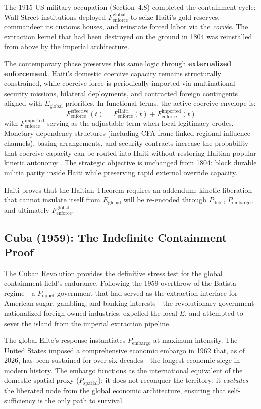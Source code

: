 \documentclass[12pt,openany]{book}
\begin{document}
The 1915 US military occupation (Section~4.8) completed the containment cycle: Wall Street institutions deployed $F_{\text{enforce}}^{\text{global}}$ to seize Haiti's gold reserves, commandeer its customs houses, and reinstate forced labor via the \textit{corv\'{e}e}. The extraction kernel that had been destroyed on the ground in 1804 was reinstalled from above by the imperial architecture.

The contemporary phase preserves this same logic through \textbf{externalized enforcement}. Haiti's domestic coercive capacity remains structurally constrained, while coercive force is periodically imported via multinational security missions, bilateral deployments, and contracted foreign contingents aligned with $E_{\text{global}}$ priorities. In functional terms, the active coercive envelope is:
\[
F_{\text{enforce}}^{\text{effective}}(t)=F_{\text{enforce}}^{\text{Haiti}}(t)+F_{\text{enforce}}^{\text{imported}}(t)
\]
with $F_{\text{enforce}}^{\text{imported}}$ serving as the adjustable term when local legitimacy erodes. Monetary dependency structures (including CFA-franc-linked regional influence channels), basing arrangements, and security contracts increase the probability that coercive capacity can be routed into Haiti without restoring Haitian popular kinetic autonomy \cite{pigeaud}. The strategic objective is unchanged from 1804: block durable militia parity inside Haiti while preserving rapid external override capacity.

Haiti proves that the Haitian Theorem requires an addendum: kinetic liberation that cannot insulate itself from $E_{\text{global}}$ will be re-encoded through $P_{\text{debt}}$, $P_{\text{embargo}}$, and ultimately $F_{\text{enforce}}^{\text{global}}$.

\subsection{Cuba (1959): The Indefinite Containment Proof}

The Cuban Revolution provides the definitive stress test for the global containment field's endurance. Following the 1959 overthrow of the Batista regime---a $P_{\text{uppet}}$ government that had served as the extraction interface for American sugar, gambling, and banking interests---the revolutionary government nationalized foreign-owned industries, expelled the local $E$, and attempted to sever the island from the imperial extraction pipeline.

The global Elite's response instantiates $P_{\text{embargo}}$ at maximum intensity. The United States imposed a comprehensive economic embargo in 1962 that, as of 2026, has been sustained for over six decades---the longest economic siege in modern history. The embargo functions as the international equivalent of the domestic spatial proxy ($P_{\text{spatial}}$): it does not reconquer the territory; it \textit{excludes} the liberated node from the global economic architecture, ensuring that self-sufficiency is the only path to survival.
\end{document}
